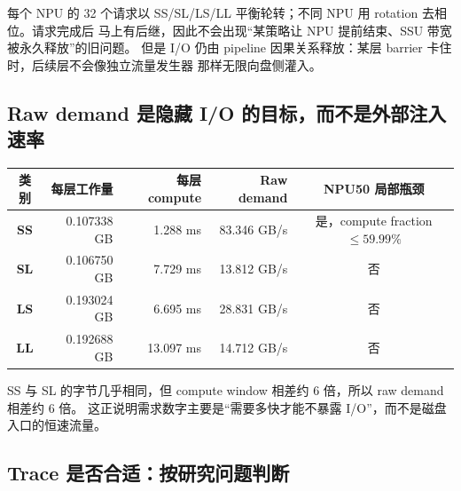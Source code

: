 \documentclass[UTF8,fontset=none,10pt,a4paper]{ctexart}
\begin{document}
\begin{center}
\end{center}

每个 NPU 的 32 个请求以 SS/SL/LS/LL 平衡轮转；不同 NPU 用 rotation 去相位。请求完成后
马上有后继，因此不会出现“某策略让 NPU 提前结束、SSU 带宽被永久释放”的旧问题。
但是 I/O 仍由 pipeline 因果关系释放：某层 barrier 卡住时，后续层不会像独立流量发生器
那样无限向盘侧灌入。

\subsection{Raw demand 是隐藏 I/O 的目标，而不是外部注入速率}

\begin{tabularx}{\textwidth}{>{\bfseries}c R R R C}
\toprule
类别 & 每层工作量 & 每层 compute & Raw demand & NPU50 局部瓶颈\\
\midrule
SS & 0.107338 GB & 1.288 ms & 83.346 GB/s & 是，compute fraction $\le 59.99\%$\\
SL & 0.106750 GB & 7.729 ms & 13.812 GB/s & 否\\
LS & 0.193024 GB & 6.695 ms & 28.831 GB/s & 否\\
LL & 0.192688 GB & 13.097 ms & 14.712 GB/s & 否\\
\bottomrule
\end{tabularx}

SS 与 SL 的字节几乎相同，但 compute window 相差约 6 倍，所以 raw demand 相差约 6 倍。
这正说明需求数字主要是“需要多快才能不暴露 I/O”，而不是磁盘入口的恒速流量。

\subsection{Trace 是否合适：按研究问题判断}
\end{document}
